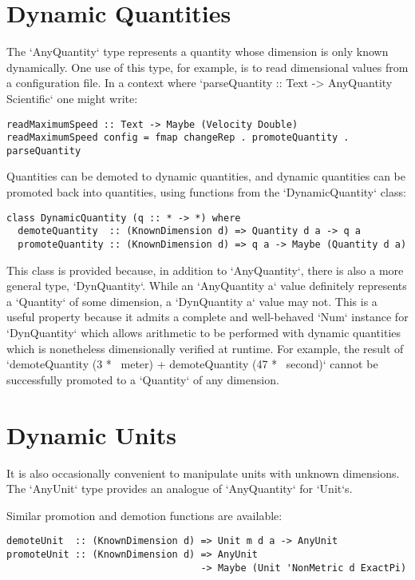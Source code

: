 \documentclass[11pt]{report}
\begin{document}
\section{Dynamic Quantities}

The `AnyQuantity` type represents a quantity whose dimension is only known dynamically. One use of this
type, for example, is to read dimensional values from a configuration file. In a context where
`parseQuantity :: Text -> AnyQuantity Scientific` one might write:

\begin{lstlisting}
readMaximumSpeed :: Text -> Maybe (Velocity Double)
readMaximumSpeed config = fmap changeRep . promoteQuantity . parseQuantity
\end{lstlisting}

Quantities can be demoted to dynamic quantities, and dynamic quantities can be promoted back into quantities,
using functions from the `DynamicQuantity` class:

\begin{lstlisting}
class DynamicQuantity (q :: * -> *) where
  demoteQuantity  :: (KnownDimension d) => Quantity d a -> q a
  promoteQuantity :: (KnownDimension d) => q a -> Maybe (Quantity d a)
\end{lstlisting}

This class is provided because, in addition to `AnyQuantity`, there is also a more general type, `DynQuantity`.
While an `AnyQuantity a` value definitely represents a `Quantity` of some dimension, a `DynQuantity a` value may not.
This is a useful property because it admits a complete and well-behaved `Num` instance for `DynQuantity` which allows
arithmetic to be performed with dynamic quantities which is nonetheless dimensionally verified at runtime. For example,
the result of `demoteQuantity (3 *~ meter) + demoteQuantity (47 *~ second)` cannot be successfully promoted to a `Quantity`
of any dimension.

\section{Dynamic Units}

It is also occasionally convenient to manipulate units with unknown dimensions. The `AnyUnit` type provides
an analogue of `AnyQuantity` for `Unit`s.

Similar promotion and demotion functions are available:

\begin{lstlisting}
demoteUnit  :: (KnownDimension d) => Unit m d a -> AnyUnit
promoteUnit :: (KnownDimension d) => AnyUnit
                                  -> Maybe (Unit 'NonMetric d ExactPi)
\end{lstlisting}
\end{document}
